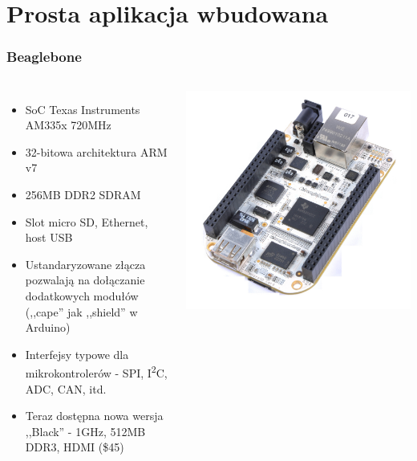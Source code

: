 \documentclass[dvipsnames,table]{beamer}
\begin{document}
\section{Prosta aplikacja wbudowana}

\begin{frame}
\frametitle{Beaglebone}

\begin{columns}[c]
\column{3in}

\begin{itemize}

	\item SoC Texas Instruments AM335x 720MHz
	\item 32-bitowa architektura ARM v7
	\item 256MB DDR2 SDRAM
	\item Slot micro SD, Ethernet, host USB
	\item Ustandaryzowane złącza pozwalają na dołączanie dodatkowych modułów (,,cape'' jak ,,shield'' w Arduino)
	\item Interfejsy typowe dla mikrokontrolerów - SPI, I\textsuperscript{2}C, ADC, CAN, itd.
	\item Teraz dostępna nowa wersja ,,Black'' - 1GHz, 512MB DDR3, HDMI (\$45)
\end{itemize}

\column{1.5in}
	\includegraphics[scale=0.5]{img_beaglebone.jpg}
\end{columns}
\end{frame}
\end{document}
